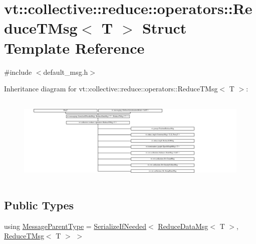 \hypertarget{structvt_1_1collective_1_1reduce_1_1operators_1_1_reduce_t_msg}{}\section{vt\+:\+:collective\+:\+:reduce\+:\+:operators\+:\+:Reduce\+T\+Msg$<$ T $>$ Struct Template Reference}
\label{structvt_1_1collective_1_1reduce_1_1operators_1_1_reduce_t_msg}


{\ttfamily \#include $<$default\+\_\+msg.\+h$>$}

Inheritance diagram for vt\+:\+:collective\+:\+:reduce\+:\+:operators\+:\+:Reduce\+T\+Msg$<$ T $>$\+:\begin{figure}[H]
\begin{center}
\leavevmode
\includegraphics[height=4.216290cm]{structvt_1_1collective_1_1reduce_1_1operators_1_1_reduce_t_msg}
\end{center}
\end{figure}
\subsection*{Public Types}
\begin{DoxyCompactItemize}
\item 
using \hyperlink{structvt_1_1collective_1_1reduce_1_1operators_1_1_reduce_t_msg_a0dd12197060e03bb7e73dbe299044f22}{Message\+Parent\+Type} = \hyperlink{namespacevt_a0a4ad8c256fcffa564e9fa7800e4b495}{Serialize\+If\+Needed}$<$ \hyperlink{structvt_1_1collective_1_1reduce_1_1operators_1_1_reduce_data_msg}{Reduce\+Data\+Msg}$<$ T $>$, \hyperlink{structvt_1_1collective_1_1reduce_1_1operators_1_1_reduce_t_msg}{Reduce\+T\+Msg}$<$ T $>$ $>$
\end{DoxyCompactItemize}
